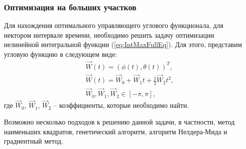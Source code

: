 \subsubsection{Оптимизация на больших участков}
\noindent\indent Для нахождения оптимального управляющего углового функционала,
для нектором интервале времени, необходимо решить задачу оптимизации нелинейной
интегральной функции (\ref{eq:IntMaxFullEq}). Для этого, представим угловую функцию
в следующем виде:
\begin{equation}
  \begin{aligned}
    & \vec{W}(t) = (\phi(t), \theta(t))^T, \\
    & \vec{W}(t) = \vec{W}_0 + \vec{W}_1 t + \frac{1}{2}\vec{W}_2 t^2, \\
    & \vec{W}_0, \vec{W}_1, \vec{W}_2 \in [-\pi, \pi],
  \end{aligned}
\end{equation}
где $\vec{W}_0$, $\vec{W}_1$, $\vec{W}_2$ -- коэффициенты, которые необходимо найти.\par
  Возможно несколько подходов к решению данной задачи, в частности, метод наименьших
квадратов, генетический алгоритм, алгоритм Нелдера-Мида и градиентный метод.
